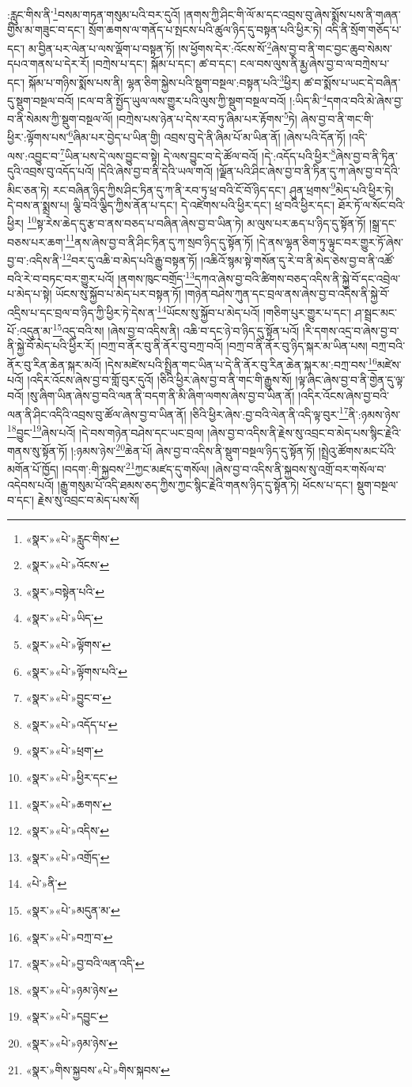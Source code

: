 :རླུང་གིས་ནི་\footnote{«སྣར་»«པེ་»རླུང་གིས་}བསམ་གཏན་གསུམ་པའི་བར་དུའོ། །ནགས་ཀྱི་ཤིང་གི་ལོ་མ་དང་འབྲས་བུ་ཞེས་སྨོས་པས་ནི་གཞན་གྱིས་མ་གཟུང་བ་དང་། སྲོག་ཆགས་ལ་གནོད་པ་སྤངས་པའི་ཚུལ་ཉིད་དུ་བསྟན་པའི་ཕྱིར་ཏེ། འདི་ནི་སྲོག་གཅོད་པ་དང་། མ་བྱིན་པར་ལེན་པ་ལས་ལྡོག་པ་བསྟན་ཏོ། །ས་ཕྱོགས་དེར་:འོངས་སོ་\footnote{«སྣར་»«པེ་»འོངས་}ཞེས་བྱ་བ་ནི་གང་བྱང་ཆུབ་སེམས་དཔའ་གནས་པ་དེར་རོ། །བཀྲེས་པ་དང་། སྐོམ་པ་དང་། ཚ་བ་དང་། ངལ་བས་ལུས་ནི་རྨྱ་ཞེས་བྱ་བ་ལ་བཀྲེས་པ་དང་། སྐོམ་པ་གཉིས་སྨོས་པས་ནི། ལྷན་ཅིག་སྐྱེས་པའི་སྡུག་བསྔལ་:བསྟན་པའི་\footnote{«སྣར་»བསྟེན་པའི་}ཕྱིར། ཚ་བ་སྨོས་པ་ཡང་དེ་བཞིན་དུ་སྡུག་བསྔལ་བའོ། །ངལ་བ་ནི་སྤྱོད་ཡུལ་ལས་གྱུར་པའི་ལུས་ཀྱི་སྡུག་བསྔལ་བའོ། །:ཡིད་མི་\footnote{«སྣར་»«པེ་»ཡིད་}དགའ་བའི་མེ་ཞེས་བྱ་བ་ནི་སེམས་ཀྱི་སྡུག་བསྔལ་ལོ། །བཀྲེས་པས་ཉེན་པ་དེས་རབ་ཏུ་ཞིམ་པར་རྟོགས་\footnote{«སྣར་»«པེ་»ལྟོགས་}ཏེ། ཞེས་བྱ་བ་ནི་གང་གི་ཕྱིར་:ལྟོགས་པས་\footnote{«སྣར་»«པེ་»ལྟོགས་པའི་}ཞིམ་པར་བྱེད་པ་ཡིན་གྱི། འབྲས་བུ་དེ་ནི་ཞིམ་པོ་མ་ཡིན་ནོ། །ཞེས་པའི་དོན་ཏོ། །འདི་ལས་:འབྱུང་བ་\footnote{«སྣར་»«པེ་»བྱུང་བ་}ཡིན་པས་དེ་ལས་བྱུང་བ་སྟེ། དེ་ལས་བྱུང་བ་དེ་ཚོལ་བའོ། །དེ་:འདོད་པའི་ཕྱིར་\footnote{«སྣར་»«པེ་»འདོད་པ་}ཞེས་བྱ་བ་ནི་ཏིན་དུའི་འབྲས་བུ་འདོད་པའོ། །དེའི་ཞེས་བྱ་བ་ནི་དེའི་ཡལ་གའོ། །ལྗོན་པའི་ཤིང་ཞེས་བྱ་བ་ནི་ཏིན་དུ་ཀ་ཞེས་བྱ་བ་དེའི་མིང་ཅན་ཏེ། རང་བཞིན་ཉིད་ཀྱིས་ཤིང་ཏིན་དུ་ཀ་ནི་རབ་ཏུ་ཕྲ་བའི་ངོ་བོ་ཉིད་དང་། ཤུན་ཕྲགས་\footnote{«སྣར་»«པེ་»ཕྲག་}མེད་པའི་ཕྱིར་ཏེ། དེ་བས་ན་སྨྲས་པ། ལྕི་བའི་ལྕིད་ཀྱིས་ནོན་པ་དང་། དེ་འཛེགས་པའི་ཕྱིར་དང་། ཕྲ་བའི་ཕྱིར་དང་། ཐོར་ཏོ་ལ་སོང་བའི་ཕྱིར། \footnote{«སྣར་»«པེ་»ཕྱིར་དང་}སྟ་རེས་ཆེད་དུ་རྩ་བ་ནས་བཅད་པ་བཞིན་ཞེས་བྱ་བ་ཡིན་ཏེ། མ་ལུས་པར་ཆད་པ་ཉིད་དུ་སྟོན་ཏོ། །སྒྲ་དང་བཅས་པར་ཆག་\footnote{«སྣར་»«པེ་»ཆགས་}ནས་ཞེས་བྱ་བ་ནི་ཤིང་ཏིན་དུ་ཀ་སྲབ་ཉིད་དུ་སྟོན་ཏོ། །དེ་ནས་ལྷན་ཅིག་ཏུ་ལྟུང་བར་གྱུར་ཏོ་ཞེས་བྱ་བ་:འདིས་ནི་\footnote{«སྣར་»«པེ་»འདིས་}བར་དུ་འཆི་བ་མེད་པའི་རྒྱུ་བསྟན་ཏོ། །འཆིའོ་སྙམ་སྟེ་གསོན་དུ་རེ་བ་ནི་མེད་ཅེས་བྱ་བ་ནི་འཚོ་བའི་རེ་བ་བཏང་བར་གྱུར་པའོ། །ནགས་ཁུང་བགྲོད་\footnote{«སྣར་»«པེ་»འགྲོད་}དཀའ་ཞེས་བྱ་བའི་ཚིགས་བཅད་འདིས་ནི་སྐྱེ་བོ་དང་འབྲེལ་པ་མེད་པ་སྟེ། ཡོངས་སུ་སྐྱོབ་པ་མེད་པར་བསྟན་ཏོ། །གཉེན་བཤེས་ཀུན་དང་བྲལ་ནས་ཞེས་བྱ་བ་འདིས་ནི་སྐྱེ་བོ་འདྲིས་པ་དང་བྲལ་བ་ཉིད་ཀྱི་ཕྱིར་ཏེ་དེས་ན་\footnote{«པེ་»ནི་}ཡོངས་སུ་སྐྱོབ་པ་མེད་པའོ། །གཅིག་པུར་གྱུར་པ་དང་། ཤ་སྦྲང་མང་པོ་:འདུན་མ་\footnote{«སྣར་»«པེ་»མདུན་མ་}འདུ་བའི་ས། །ཞེས་བྱ་བ་འདིས་ནི། འཆི་བ་དང་ཉེ་བ་ཉིད་དུ་སྟོན་པའོ། །རི་དགས་འདྲ་བ་ཞེས་བྱ་བ་ནི་སྐྱེ་བོ་མེད་པའི་ཕྱིར་རོ། །བཀྲ་བ་ནོར་བུ་ནི་ནོར་བུ་བཀྲ་བའོ། །བཀྲ་བ་ནི་ནོར་བུ་ཉིད་སྐར་མ་ཡིན་པས། བཀྲ་བའི་ནོར་བུ་རིན་ཆེན་སྐར་མའོ། །དེས་མཛེས་པའི་སྤྲིན་གང་ཡིན་པ་དེ་ནི་ནོར་བུ་རིན་ཆེན་སྐར་མ་:བཀྲ་བས་\footnote{«སྣར་»«པེ་»བཀྲ་བ་}མཛེས་པའོ། །འདིར་འོངས་ཞེས་བྱ་བ་གློ་བུར་དུའོ། །ཅིའི་ཕྱིར་ཞེས་བྱ་བ་ནི་གང་གི་རྒྱུས་སོ། །ལྟ་ཞིང་ཞེས་བྱ་བ་ནི་གྱེན་དུ་ལྟ་བའོ། །སུ་ཞིག་ཡིན་ཞེས་བྱ་བའི་ལན་ནི་བདག་ནི་མི་ཞིག་ལགས་ཞེས་བྱ་བ་ཡིན་ནོ། །འདིར་འོངས་ཞེས་བྱ་བའི་ལན་ནི་ཤིང་འདིའི་འབྲས་བུ་ཚོལ་ཞེས་བྱ་བ་ཡིན་ནོ། །ཅིའི་ཕྱིར་ཞེས་:བྱ་བའི་ལེན་ནི་འདི་ལྟ་བུར་\footnote{«སྣར་»«པེ་»བྱ་བའི་ལན་འདི་}ནི་:ཉམས་ཉེས་\footnote{«སྣར་»«པེ་»ཉམ་ཉེས་}བྱུང་\footnote{«སྣར་»«པེ་»དབྱུང་}ཞེས་པའོ། །དེ་བས་གཉེན་བཤེས་དང་ཡང་བྲལ། །ཞེས་བྱ་བ་འདིས་ནི་རྗེས་སུ་འབྲང་བ་མེད་པས་སྙིང་རྗེའི་གནས་སུ་སྟོན་ཏོ། །:ཉམས་ཉེས་\footnote{«སྣར་»«པེ་»ཉམ་ཉེས་}ཆེན་པོ། ཞེས་བྱ་བ་འདིས་ནི་སྡུག་བསྔལ་ཉིད་དུ་སྟོན་ཏོ། །སྤྲེའུ་ཚོགས་མང་པོའི་མགོན་པོ་ཁྱོད། །བདག་:གི་སྐྱབས་\footnote{«སྣར་»གིས་སྐྱབས་«པེ་»གིས་སྐབས་}ཀྱང་མཛད་དུ་གསོལ། །ཞེས་བྱ་བ་འདིས་ནི་སྐྱབས་སུ་འགྲོ་བར་གསོལ་བ་འདེབས་པའོ། །རྒྱུ་གསུམ་པོ་འདི་ཐམས་ཅད་ཀྱིས་ཀྱང་སྙིང་རྗེའི་གནས་ཉིད་དུ་སྟོན་ཏེ། ཕོངས་པ་དང་། སྡུག་བསྔལ་བ་དང་། རྗེས་སུ་འབྲང་བ་མེད་པས་སོ། 